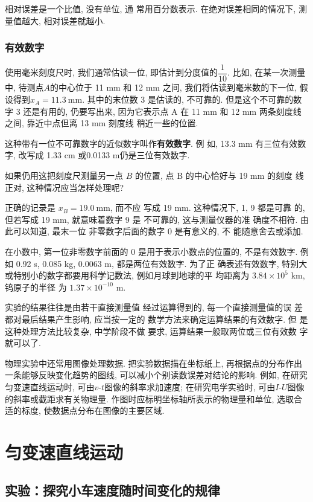 \documentclass[11pt,a4paper]{ctexbook}
\newcommand{\unit}[1]{\ \mathrm{#1}}
\begin{document}
相对误差是一个比值, 没有单位, 通
常用百分数表示. 在绝对误差相同的情况下, 测
量值越大, 相对误差就越小.

\subsection{有效数字}
使用毫米刻度尺时, 我们通常估读一位, 即估计到分度值的$\dfrac{1}{10}$.
比如, 在某一次测量中, 待测点$A$的中心位于 11 mm 和 12 mm 之间,
我们将估读到毫米数的下一位, 假设得到$x_A = 11.3 \unit{mm}$. 其中的末位数 3 是估读的, 不可靠的.
但是这个不可靠的数字 3 还是有用的, 仍要写出来,
因为它表示点 A 在 11 mm 和 12 mm 两条刻度线之间, 靠近中点但离 13 mm 刻度线
稍近一些的位置.

这种带有一位不可靠数字的近似数字叫作\textbf{有效数字}. 例
如, 13.3 mm 有三位有效数字, 改写成 1.33 cm 或0.0133 m仍是三位有效数字.

{\kaishu 如果仍用这把刻度尺测量另一点 $B$ 的位置, 点 B 的中心恰好与 19 mm 的刻度
线正对, 这种情况应当怎样处理呢?}

正确的记录是 $x_B = 19.0 \unit{mm}$, 而不应
写成 19 mm. 这种情况下, 1, 9 都是可靠
的, 但若写成 19 mm, 就意味着数字 9 是
不可靠的, 这与测量仪器的准
确度不相符. 由此可以知道, 最末一位
非零数字后面的数字 0 是有意义的, 不
能随意舍去或添加.

在小数中, 第一位非零数字前面的 0 是用于表示小数点的位置的,
不是有效数字. 例如 0.92 s, 0.085 kg, 0.0063 m, 都是两位有效数字. 为了正
确表述有效数字, 特别大或特别小的数字都要用科学记数法, 例如月球到地球的平
均距离为 $3.84\times 10^5$ km,  钨原子的半径
为 $1.37\times10^{-10}$ m.

实验的结果往往是由若干直接测量值
经过运算得到的, 每一个直接测量值的误
差都对最后结果产生影响, 应当按一定的
数学方法来确定运算结果的有效数字. 但
是这种处理方法比较复杂, 中学阶段不做
要求, 运算结果一般取两位或三位有效数
字就可以了.

物理实验中还常用图像处理数据. 把实验数据描在坐标纸上, 再根据点的分布作出一条能够反映变化趋势的图线, 可以减小个别读数误差对结论的影响. 例如, 在研究匀变速直线运动时, 可由$v$-$t$图像的斜率求加速度; 在研究电学实验时, 可由$I$-$U$图像的斜率或截距求有关物理量. 作图时应标明坐标轴所表示的物理量和单位, 选取合适的标度, 使数据点分布在图像的主要区域.


\chapter{匀变速直线运动}


\section{实验：探究小车速度随时间变化的规律}
\end{document}
